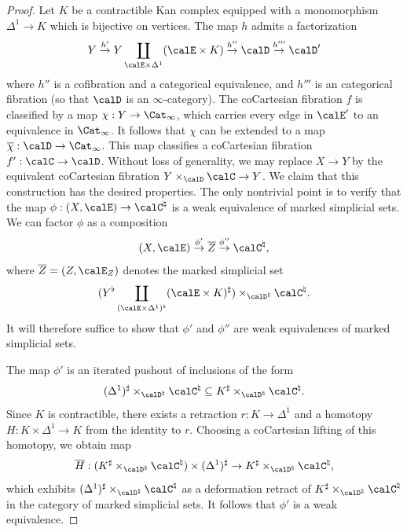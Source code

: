 \begin{proof}
Let $K$ be a contractible Kan complex equipped with a monomorphism $\Delta^1 \rightarrow K$ which is bijective on vertices. The map $h$ admits a factorization
$$ Y \stackrel{h'}{\rightarrow} Y \coprod_{\calE \times \Delta^1} (\calE \times K)
\stackrel{h''}{\rightarrow} \calD \stackrel{h'''}{\rightarrow} \calD'$$
where $h''$ is a cofibration and a categorical equivalence, and $h'''$ is an categorical fibration (so that $\calD$ is an $\infty$-category).
The coCartesian fibration $f$ is classified by a map $\chi: Y \rightarrow \Cat_{\infty}$, which carries
every edge in $\calE'$ to an equivalence in $\Cat_{\infty}$. It follows that $\chi$ can be extended to a map
$\overline{\chi}: \calD \rightarrow \Cat_{\infty}$. This map classifies a coCartesian fibration
$f': \calC \rightarrow \calD$. Without loss of generality, we may replace $X \rightarrow Y$ by the equivalent coCartesian fibration $Y \times_{\calD} \calC \rightarrow Y$. We claim that this construction has the desired properties. The only nontrivial point is to verify that the map $\phi:(X, \calE) \rightarrow \calC^{\natural}$ is a weak equivalence of marked simplicial sets. We can factor $\phi$ as a composition
$$ (X, \calE) \stackrel{\phi'}{\rightarrow} \overline{Z} \stackrel{\phi''}{\rightarrow} \calC^{\natural},$$
where $\overline{Z} = (Z, \calE_{Z})$ denotes the marked simplicial set
$$ (Y^{\flat} \coprod_{ (\calE \times \Delta^1)^{\flat}} (\calE \times K)^{\sharp})
\times_{ \calD^{\natural} } \calC^{\natural}. $$
It will therefore suffice to show that $\phi'$ and $\phi''$ are weak equivalences of marked simplicial sets.

The map $\phi'$ is an iterated pushout of inclusions of the form
$$ ( \Delta^1)^{\sharp} \times_{ \calD^{\natural} } \calC^{\natural}
\subseteq K^{\sharp} \times_{ \calD^{\natural} } \calC^{\natural}.$$
Since $K$ is contractible, there exists a retraction $r: K \rightarrow \Delta^1$ and a homotopy
$H: K \times \Delta^1 \rightarrow K$ from the identity to $r$. Choosing a coCartesian lifting of this
homotopy, we obtain map
$$ \overline{H}: (K^{\sharp} \times_{ \calD^{\natural} } \calC^{\natural}) \times (\Delta^1)^{\sharp}
\rightarrow K^{\sharp} \times_{ \calD^{\natural} } \calC^{\natural},$$
which exhibits $( \Delta^1)^{\sharp} \times_{ \calD^{\natural} } \calC^{\natural}$ as a deformation
retract of $K^{\sharp} \times_{ \calD^{\natural} } \calC^{\natural}$ in the category of marked simplicial sets. It follows that $\phi'$ is a weak equivalence.


\end{proof}
